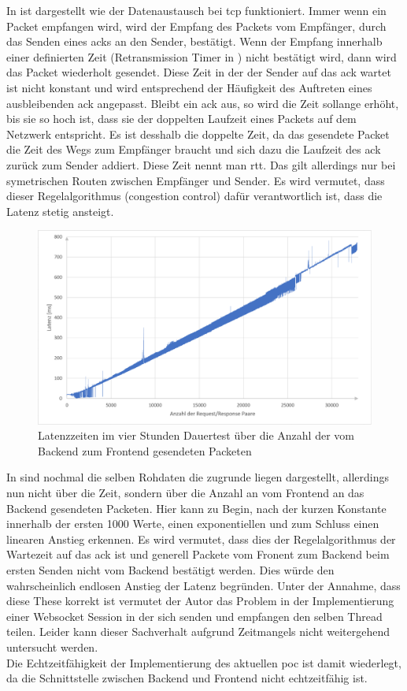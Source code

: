 In  ist dargestellt wie der Datenaustausch bei tcp funktioniert.
Immer wenn ein Packet empfangen wird, wird der Empfang des Packets vom Empfänger, durch das Senden eines \acp{ack} an den Sender, bestätigt.
Wenn der Empfang innerhalb einer definierten Zeit (Retransmission Timer in ) nicht bestätigt wird, 
dann wird das Packet wiederholt gesendet.
Diese Zeit in der der Sender auf das \ac{ack} wartet ist nicht konstant und wird entsprechend der Häufigkeit des Auftreten eines ausbleibenden \ac{ack} angepasst.
Bleibt ein \ac{ack} aus, so wird die Zeit sollange erhöht, bis sie so hoch ist, dass sie der doppelten Laufzeit eines Packets auf dem Netzwerk entspricht.
Es ist desshalb die doppelte Zeit, da das gesendete Packet die Zeit des Wegs zum Empfänger braucht und sich dazu die Laufzeit des \ac{ack} zurück zum Sender addiert. Diese Zeit nennt man \ac{rtt}.
Das gilt allerdings nur bei symetrischen Routen zwischen Empfänger und Sender.
Es wird vermutet, dass dieser Regelalgorithmus (congestion control) dafür verantwortlich ist, dass die Latenz stetig ansteigt.
\begin{figure}[ht]
  \centering
  \includegraphics[width=\textwidth]{content/hauptteil/umsetzungPoC/pocTest/res/LatenzNormal4hReqRes.pdf}
  \caption{Latenzzeiten im vier Stunden Dauertest über die Anzahl der vom Backend zum Frontend gesendeten Packeten}
  \label{fig:testing:latency4hNorm:cnt}
\end{figure}
In  sind nochmal die selben Rohdaten die  zugrunde liegen dargestellt, 
allerdings nun nicht über die Zeit, 
sondern über die Anzahl an vom Frontend an das Backend gesendeten Packeten. 
Hier kann zu Begin, nach der kurzen Konstante innerhalb der ersten 1000 Werte, einen exponentiellen und zum Schluss einen linearen Anstieg erkennen.
Es wird vermutet, dass dies der Regelalgorithmus der Wartezeit auf das \ac{ack} ist und generell Packete vom Fronent zum Backend beim ersten Senden nicht vom Backend bestätigt werden.
Dies würde den wahrscheinlich endlosen Anstieg der Latenz begründen.
Unter der Annahme, dass diese These korrekt ist vermutet der Autor das Problem in der Implementierung einer Websocket Session in der sich senden und empfangen den selben Thread teilen.
Leider kann dieser Sachverhalt aufgrund Zeitmangels nicht weitergehend untersucht werden.
\\Die Echtzeitfähigkeit der Implementierung des aktuellen \ac{poc} ist damit wiederlegt, da die Schnittstelle zwischen Backend und Frontend nicht echtzeitfähig ist.
